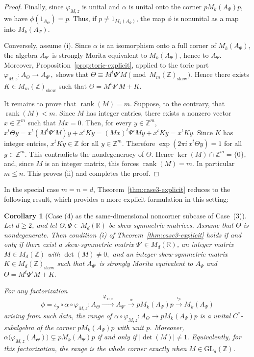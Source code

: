 \documentclass[11pt]{amsart}
\newtheorem{corollary}[theorem]{Corollary}
\theoremstyle{definition}
\theoremstyle{remark}
\newcommand{\Z}{\mathbb{Z}}
\newcommand{\R}{\mathbb{R}}
\newcommand{\GL}{\mathrm{GL}}
\begin{document}
\begin{proof}
Finally, since $\varphi_{M,z}$ is unital and $\alpha$ is unital onto the
corner $pM_k(A_\Psi)p$, we have $\phi(1_{A_\Theta})=p.$
Thus, if $p\neq 1_{M_k(A_\Psi)}$, the map $\phi$ is nonunital as a map
into $M_k(A_\Psi)$.

Conversely, assume \textup{(i)}. Since $\alpha$ is an isomorphism onto a full
corner of $M_k(A_\Psi)$, the algebra $A_{\Psi'}$ is strongly Morita
equivalent to $M_k(A_\Psi)$, hence to $A_\Psi$. Moreover,
Proposition~\ref{prop:toric-explicit}, applied to the toric part $\varphi_{M,z}\colon A_\Theta\to A_{\Psi'},$
shows that $\Theta\equiv M^t\Psi'M
\pmod{M_m(\Z)_{\mathrm{skew}}}.$
Hence there exists $K\in M_m(\Z)_{\mathrm{skew}}$
such that $\Theta=M^t\Psi'M+K.$

It remains to prove that $\operatorname{rank}(M)=m$. Suppose, to the
contrary, that $\operatorname{rank}(M)<m$. Since $M$ has integer entries,
there exists a nonzero vector $x\in\Z^m$
such that $Mx=0.$
Then, for every $y\in\Z^m$, $x^t\Theta y=x^t(M^t\Psi'M)y+x^tKy=(Mx)^t\Psi'My+x^tKy=x^tKy.$
Since $K$ has integer entries, $x^tKy\in\Z$
for all $y\in\Z^m.$
Therefore $\exp(2\pi i\,x^t\Theta y)=1$
for all $y\in\Z^m.$
This contradicts the nondegeneracy of $\Theta$. Hence $\ker(M)\cap\Z^m=\{0\},$
and, since $M$ is an integer matrix, this forces $\operatorname{rank}(M)=m.$
In particular $m\leq n$. This proves \textup{(ii)} and completes the proof.
\end{proof}

In the special case  $m=n=d$, Theorem~\ref{thm:case3-explicit} reduces to the following result, which provides a more explicit formulation in this setting:
\begin{corollary}[Case (4) as the same-dimensional noncorner subcase of Case~\textup{(3)}]
\label{cor:case3-from-case4}
Let $d\geq 2$, and let $\Theta,\Psi\in M_d(\R)$ be skew-symmetric matrices.
Assume that $\Theta$ is nondegenerate. Then condition \textup{(i)} of
Theorem~\ref{thm:case3-explicit} holds if and only if there exist a
skew-symmetric matrix $\Psi'\in M_d(\R)$, an integer matrix
$M\in M_d(\Z)$ with $\det(M)\neq 0,$
and an integer skew-symmetric matrix
$K\in M_d(\Z)_{\mathrm{skew}}$
such that $A_{\Psi'}$ is strongly Morita equivalent to $A_\Psi$ and $
\Theta=M^t\Psi' M+K.$

For any factorization
\[
\phi=
\iota_p\circ \alpha\circ \varphi_{M,z}
\colon
A_\Theta
\xrightarrow{\ \varphi_{M,z}\ }
A_{\Psi'}
\xrightarrow{\ \alpha\ }
pM_k(A_\Psi)p
\xrightarrow{\ \iota_p\ }
M_k(A_\Psi)
\]
arising from such data, the range of $\alpha\circ \varphi_{M,z}
\colon A_\Theta\to pM_k(A_\Psi)p$
is a unital $C^*$-subalgebra of the corner $pM_k(A_\Psi)p$ with unit $p$.
Moreover, $\alpha\bigl(\varphi_{M,z}(A_\Theta)\bigr)
\subsetneq pM_k(A_\Psi)p$
if and only if $|\det(M)|\neq 1.$
Equivalently, for this factorization, the range is the whole corner exactly
when $M\in \GL_d(\Z)$.
\end{corollary}
\end{document}
